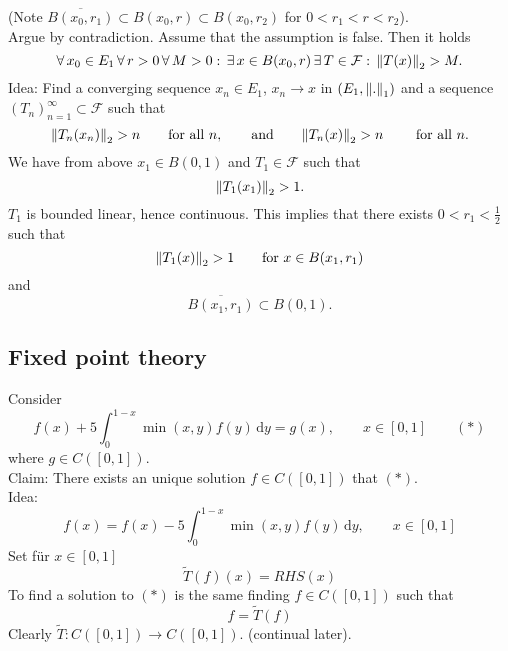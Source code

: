 \begin{beweis}
\begin{enumerate}[step 1:]
\[			\]
			(Note $\overline{B(x_0,r_1)} \subset B(x_0,r) \subset B(x_0,r_2)$ for $0 < r_1 < r < r_2$). \\
			Argue by contradiction. Assume that the assumption is false. Then it holds
			\[
				\forall\, x_0 \in E_1 \, \forall\, r >0 \,\forall\,  M>0: \,\exists\, x \in B(x_0,r) \,\exists\, T \in \mathcal{F} : \, \norm{T(x)}_2 > M.
			\]
			Idea: Find a converging sequence $x_n \in E_1$, $x_n \to x$ in $(E_1,\norm{.}_1)$ and a sequence $(T_n)_{n=1}^{\infty} \subset \mathcal{F}$ such that
			\[
				\norm{T_n(x_n)}_2 > n \qquad \text{for all }n, \qquad \text{and} \qquad \norm{T_n(x)}_2 > n \qquad \text{ for all }n.
			\]
			We have from above $x_1 \in B(0,1)$ and $T_1 \in  \mathcal{F}$ such that \[
				\norm{T_1(x_1)}_2 > 1.
			\] $T_1$ is bounded linear, hence continuous. This implies that there exists $0<r_1 < \frac{1}{2}$ such that
			\[
				\norm{T_1(x)}_2 >1 \qquad \text{for }x \in B(x_1,r_1)
			\]
			and \[
				\overline{B(x_1,r_1)}\subset B(0,1).
			\]
		\end{enumerate}
	\end{beweis}
\subsection{Fixed point theory} 
\label{sub:fixed_point_theory}
\begin{beispiel}
	Consider
	\[
		f(x)+ 5 \int_{0}^{1-x} \min(x,y)f(y) \,\mathrm{d}y = g(x), \qquad x \in [0,1] \qquad (*)
	\]
	where $g \in C([0,1])$. \\ 
	Claim: There exists an unique solution $f \in C([0,1])$ that $(*)$. \\
	Idea:
	\[
		f(x) = f(x) - 5 \int_{0}^{1-x} \min(x,y)f(y) \,\mathrm{d}y, \qquad x \in [0,1]
	\]
	Set für $x \in [0,1]$ 
	\[
			\tilde T(f)(x) = RHS(x)
	\]
	To find a solution to $(*)$ is the same finding $f \in C([0,1])$ such that 
	\[
		f = \tilde T(f)
	\]
	Clearly $ \tilde T : C([0,1]) \to C([0,1])$. (continual later).
\end{beispiel}

